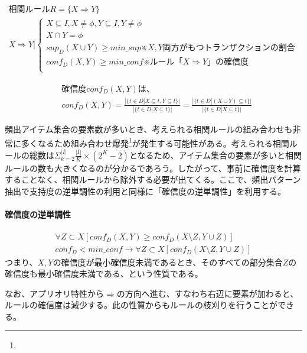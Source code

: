 \documentclass[dvipdfmx]{jsarticle}
\begin{document}
\begin{gather*}
  相関ルールR = \{ X \Rightarrow Y \} \\
  X \Rightarrow Y |
  \begin{cases}
    {X \subseteq I, X \neq \phi , Y \subseteq I, Y \neq \phi} \\
    {X \cap Y = \phi} \\
    {sup_{D}(X\cup Y) \geq min\_sup}　※X,Y両方がもつトランザクションの割合\\
    {conf_{D}(X, Y) \geq min\_conf}　※ルール「X \Rightarrow Y」の確信度\\
  \end{cases}
\end{gather*}
\begin{fleqn}
  \begin{align*}
    &確信度conf_{D}(X, Y)は、\\
    &conf_{D}(X, Y) = \frac{|\{t\in D |X \subseteq t, Y \subseteq t\}|}{|\{ t\in D | X \subseteq t\}|}
    = \frac{|\{ t \in D | (X\cup Y) \subseteq t\}|}{|\{ t \in D | X \subseteq t\}|}
  \end{align*}
\end{fleqn}
頻出アイテム集合の要素数が多いとき、考えられる相関ルールの組み合わせも非常に多くなるため組み合わせ爆発\footnote{}が発生する可能性がある。考えられる相関ルールの総数は$\Sigma_{k=2}^{|I|}\frac{|I|}{K}\times (2^{K}-2)$となるため、アイテム集合の要素が多いと相関ルールの数も大きくなるのが分かるであろう。したがって、事前に確信度を計算することなく、相関ルールから除外する必要が出てくる。ここで、頻出パターン抽出で支持度の逆単調性の利用と同様に「確信度の逆単調性」を利用する。
\paragraph{確信度の逆単調性}
\begin{gather*}
  \forall Z \subset X[ conf_{D}(X, Y) \geq conf_{D}(X \setminus Z, Y \cup Z)] \\
  conf_{D} < min\_conf \rightarrow \forall Z \subset X[conf_{D}(X \setminus Z, Y \cup Z)]
\end{gather*}
つまり、$X, Y$の確信度が最小確信度未満であるとき、そのすべての部分集合$Z$の確信度も最小確信度未満である、という性質である。\par
なお、アプリオリ特性から$\Rightarrow$の方向へ進む、すなわち右辺に要素が加わると、ルールの確信度は減少する。此の性質からもルールの枝刈りを行うことができる。
\end{document}
